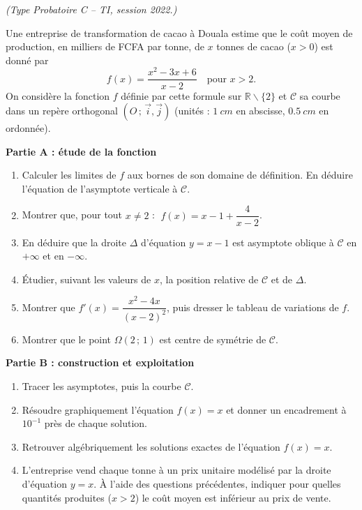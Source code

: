 \documentclass[11pt]{article}
\def\setminus{\mathbin{\backslash}}\let\smallsetminus\setminus
\begin{document}
\begin{exercice}
\emph{(Type Probatoire C -- TI, session 2022.)}

Une entreprise de transformation de cacao à Douala estime que le coût moyen de production, en milliers de FCFA par tonne, de $x$ tonnes de cacao ($x>0$) est donné par
\[ f(x)=\frac{x^2-3x+6}{x-2}\quad \text{pour } x>2. \]
On considère la fonction $f$ définie par cette formule sur $\mathbb{R}\setminus\{2\}$ et $\mathscr{C}$ sa courbe dans un repère orthogonal $(O\,;\,\vec{i},\vec{j})$ (unités : $\SI{1}{cm}$ en abscisse, $\SI{0,5}{cm}$ en ordonnée).

\textbf{Partie A : étude de la fonction}
\begin{enumerate}
\item Calculer les limites de $f$ aux bornes de son domaine de définition. En déduire l'équation de l'asymptote verticale à $\mathscr{C}$.
\item Montrer que, pour tout $x\neq 2$ : $\;f(x)=x-1+\dfrac{4}{x-2}$.
\item En déduire que la droite $\Delta$ d'équation $y=x-1$ est asymptote oblique à $\mathscr{C}$ en $+\infty$ et en $-\infty$.
\item Étudier, suivant les valeurs de $x$, la position relative de $\mathscr{C}$ et de $\Delta$.
\item Montrer que $f'(x)=\dfrac{x^2-4x}{(x-2)^2}$, puis dresser le tableau de variations de $f$.
\item Montrer que le point $\Omega(2\,;\,1)$ est centre de symétrie de $\mathscr{C}$.
\end{enumerate}

\textbf{Partie B : construction et exploitation}
\begin{enumerate}
\item Tracer les asymptotes, puis la courbe $\mathscr{C}$.
\item Résoudre graphiquement l'équation $f(x)=x$ et donner un encadrement à $10^{-1}$ près de chaque solution.
\item Retrouver algébriquement les solutions exactes de l'équation $f(x)=x$.
\item L'entreprise vend chaque tonne à un prix unitaire modélisé par la droite d'équation $y=x$. À l'aide des questions précédentes, indiquer pour quelles quantités produites ($x>2$) le coût moyen est inférieur au prix de vente.
\end{enumerate}
\end{exercice}
\end{document}

